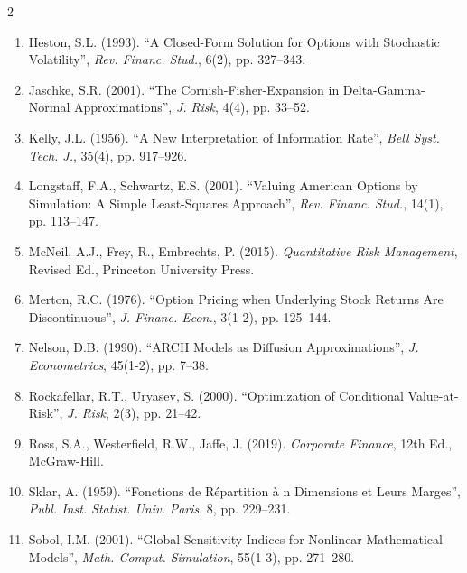 \documentclass[11pt,a4paper]{article}
\begin{document}
\begin{multicols}{2}
\begin{enumerate}
    \item Heston, S.L. (1993). ``A Closed-Form Solution for Options with Stochastic Volatility'', \textit{Rev. Financ. Stud.}, 6(2), pp. 327--343.
    \item Jaschke, S.R. (2001). ``The Cornish-Fisher-Expansion in Delta-Gamma-Normal Approximations'', \textit{J. Risk}, 4(4), pp. 33--52.
    \item Kelly, J.L. (1956). ``A New Interpretation of Information Rate'', \textit{Bell Syst. Tech. J.}, 35(4), pp. 917--926.
    \item Longstaff, F.A., Schwartz, E.S. (2001). ``Valuing American Options by Simulation: A Simple Least-Squares Approach'', \textit{Rev. Financ. Stud.}, 14(1), pp. 113--147.
    \item McNeil, A.J., Frey, R., Embrechts, P. (2015). \textit{Quantitative Risk Management}, Revised Ed., Princeton University Press.
    \item Merton, R.C. (1976). ``Option Pricing when Underlying Stock Returns Are Discontinuous'', \textit{J. Financ. Econ.}, 3(1-2), pp. 125--144.
    \item Nelson, D.B. (1990). ``ARCH Models as Diffusion Approximations'', \textit{J. Econometrics}, 45(1-2), pp. 7--38.
    \item Rockafellar, R.T., Uryasev, S. (2000). ``Optimization of Conditional Value-at-Risk'', \textit{J. Risk}, 2(3), pp. 21--42.
    \item Ross, S.A., Westerfield, R.W., Jaffe, J. (2019). \textit{Corporate Finance}, 12th Ed., McGraw-Hill.
    \item Sklar, A. (1959). ``Fonctions de Répartition à n Dimensions et Leurs Marges'', \textit{Publ. Inst. Statist. Univ. Paris}, 8, pp. 229--231.
    \item Sobol, I.M. (2001). ``Global Sensitivity Indices for Nonlinear Mathematical Models'', \textit{Math. Comput. Simulation}, 55(1-3), pp. 271--280.
\end{enumerate}
\end{multicols}
\end{document}
